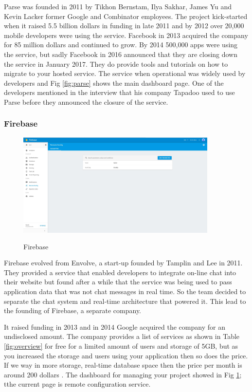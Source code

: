 Parse \cite{parse} was founded in 2011 by Tikhon Bernstam, Ilya Sakhar, James Yu and Kevin Lacker former Google and Combinator employees. The project kick-started when it raised 5.5 billion dollars in funding in late 2011 and by 2012 over 20,000 mobile developers were using the service. Facebook in 2013 acquired the company for 85 million dollars and continued to grow. By 2014 500,000 apps were using the service, but sadly Facebook in 2016 announced that they are closing down the service in January 2017. They do provide tools and tutorials on how to migrate to your hosted service. The service when operational was widely used by developers and Fig \ref{fig:parse} shows the main dashboard page. One of the developers mentioned in the interview that his company Tapadoo used to use Parse before they announced the closure of the service.

\subsubsection{Firebase}

\begin{figure}[!h]
    \caption{Firebase}
    \centering
    \includegraphics[width=100mm]{images/firebase}
    \label{fig:firebase}
\end{figure}

Firebase \cite{firebase}  evolved from Envolve, a start-up founded by Tamplin and Lee in 2011. They provided a service that enabled developers to integrate on-line chat into their website but found after a while that the service was being used to pass application data that was not chat messages in real time. So the team decided to separate the chat system and real-time architecture that powered it. This lead to the founding of Firebase, a separate company.

It raised funding in 2013 and in 2014 Google acquired the company for an undisclosed amount. The company provides a list of services as shown in Table \ref{fig:overview} for free for a limited amount of users and storage of 5GB, but as you increased the storage and users using your application then so does the price. If we way in more storage, real-time database space then the price per month is around 200 dollars \cite{firebase2}. The dashboard for managing your project showed in Fig \ref{fig:firebase}; tthe current page is remote configuration service.

